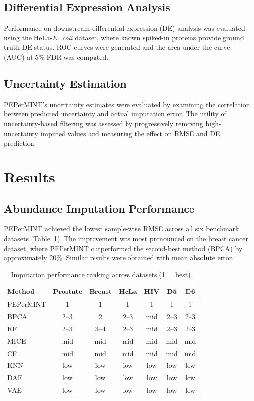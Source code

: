 \documentclass[12pt]{article}
\begin{document}
\subsection{Differential Expression Analysis}

Performance on downstream differential expression (DE) analysis was evaluated using the HeLa-\textit{E.\ coli} dataset, where known spiked-in proteins provide ground truth DE status. ROC curves were generated and the area under the curve (AUC) at 5\% FDR was computed.

\subsection{Uncertainty Estimation}

PEPerMINT's uncertainty estimates were evaluated by examining the correlation between predicted uncertainty and actual imputation error. The utility of uncertainty-based filtering was assessed by progressively removing high-uncertainty imputed values and measuring the effect on RMSE and DE prediction.

\section{Results}

\subsection{Abundance Imputation Performance}

PEPerMINT achieved the lowest sample-wise RMSE across all six benchmark datasets (Table~\ref{tab:rmse}). The improvement was most pronounced on the breast cancer dataset, where PEPerMINT outperformed the second-best method (BPCA) by approximately 20\%. Similar results were obtained with mean absolute error.

\begin{table}[ht]
\centering
\caption{Imputation performance ranking across datasets (1 = best).}
\label{tab:rmse}
\begin{tabular}{lcccccc}
\toprule
Method & Prostate & Breast & HeLa & HIV & D5 & D6 \\
\midrule
PEPerMINT & 1 & 1 & 1 & 1 & 1 & 1 \\
BPCA & 2--3 & 2 & 2--3 & mid & 2--3 & 2--3 \\
RF & 2--3 & 3--4 & 2--3 & mid & 2--3 & 2--3 \\
MICE & mid & mid & mid & mid & mid & mid \\
CF & mid & mid & mid & mid & mid & mid \\
KNN & low & low & low & low & low & low \\
DAE & low & low & low & low & low & low \\
VAE & low & low & low & low & low & low \\
\bottomrule
\end{tabular}
\end{table}
\end{document}
